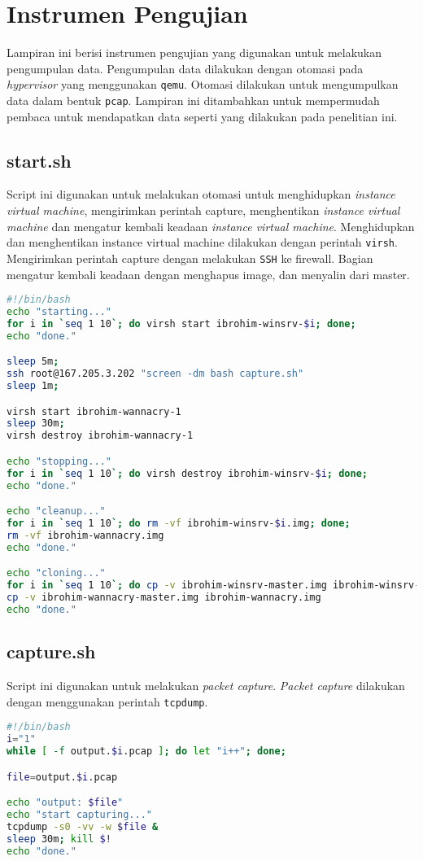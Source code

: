 \chapter{Instrumen Pengujian}

Lampiran ini berisi instrumen pengujian yang digunakan untuk melakukan pengumpulan data. Pengumpulan data dilakukan dengan otomasi pada \textit{hypervisor} yang menggunakan \verb|qemu|. Otomasi dilakukan untuk mengumpulkan data dalam bentuk \verb|pcap|. Lampiran ini ditambahkan untuk mempermudah pembaca untuk mendapatkan data seperti yang dilakukan pada penelitian ini.

\section{start.sh}

Script ini digunakan untuk melakukan otomasi untuk menghidupkan \textit{instance virtual machine}, mengirimkan perintah capture, menghentikan \textit{instance virtual machine} dan mengatur kembali keadaan \textit{instance virtual machine}. Menghidupkan dan menghentikan instance virtual machine dilakukan dengan perintah \verb|virsh|. Mengirimkan perintah capture dengan melakukan \verb|SSH| ke firewall. Bagian mengatur kembali keadaan dengan menghapus image, dan menyalin dari master.

\begin{lstlisting}[language=Bash]
#!/bin/bash
echo "starting..."
for i in `seq 1 10`; do virsh start ibrohim-winsrv-$i; done;
echo "done."

sleep 5m;
ssh root@167.205.3.202 "screen -dm bash capture.sh"
sleep 1m;

virsh start ibrohim-wannacry-1
sleep 30m;
virsh destroy ibrohim-wannacry-1

echo "stopping..."
for i in `seq 1 10`; do virsh destroy ibrohim-winsrv-$i; done;
echo "done."

echo "cleanup..."
for i in `seq 1 10`; do rm -vf ibrohim-winsrv-$i.img; done;
rm -vf ibrohim-wannacry.img
echo "done."

echo "cloning..."
for i in `seq 1 10`; do cp -v ibrohim-winsrv-master.img ibrohim-winsrv-$i.img; done;
cp -v ibrohim-wannacry-master.img ibrohim-wannacry.img
echo "done."
\end{lstlisting}

\section{capture.sh}

Script ini digunakan untuk melakukan \textit{packet capture}. \textit{Packet capture} dilakukan dengan menggunakan perintah \verb|tcpdump|.

\begin{lstlisting}[language=Bash]
#!/bin/bash
i="1"
while [ -f output.$i.pcap ]; do let "i++"; done;

file=output.$i.pcap

echo "output: $file"
echo "start capturing..."
tcpdump -s0 -vv -w $file &
sleep 30m; kill $!
echo "done."
\end{lstlisting}

